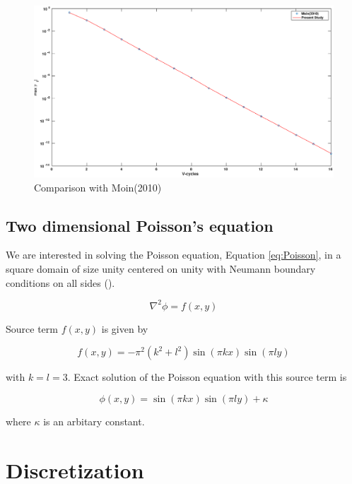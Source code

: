 \begin{figure}
 \centering
 \includegraphics[scale=0.4]{moin_1D.eps}
 \caption{Comparison with Moin(2010)}
 \label{Fig:moin1D}
\end{figure}

\subsection{Two dimensional Poisson's equation}

We are interested in solving the Poisson equation, Equation \ref{eq:Poisson}, in a square domain of size unity centered on
unity with Neumann boundary conditions on all sides (\cite{Popinet2003}).

\begin{equation}
{\nabla}^2 \phi = f(x,y)
\label{eq:Poisson}
\end{equation}

\noindent Source term $f(x,y)$ is given by

\begin{equation}
f(x,y) = -{\pi}^2(k^2+l^2)\sin(\pi k x)\sin(\pi l y)
\label{eq:Source}
\end{equation}

\noindent with $k=l=3$. Exact solution of the Poisson equation with this source term is

\begin{equation}
\phi(x,y) = \sin(\pi k x)\sin(\pi l y) + \kappa
\label{eq:Solution}
\end{equation}

\noindent where $\kappa$ is an arbitary constant.

\section{Discretization}

